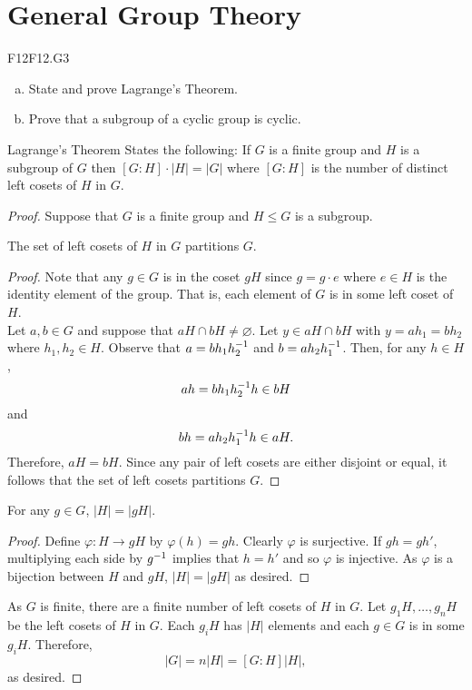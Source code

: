 \documentclass[../AlgebraQualSolutions.tex]{subfiles}
\begin{document}
\section{General Group Theory}

\begin{prob}{F12}{F12.G3}
	\begin{enumerate}[(a)]
	\item State and prove Lagrange's Theorem.
	\item Prove that a subgroup of a cyclic group is cyclic.
	\end{enumerate}
	\end{prob}
	
	Lagrange's Theorem States the following: If $G$ is a finite group and $H$ is a subgroup of $G$ then $[G:H]\cdot|H| = |G|$ where $[G:H]$ is the number of distinct left cosets of $H$ in $G$.

	\begin{proof}
		Suppose that $G$ is a finite group and $H \leq G$ is a subgroup.

		\begin{claim}
			The set of left cosets of $H$ in $G$ partitions $G$.

			\begin{proof}
				Note that any $g \in G$ is in the coset $gH$ since $g = g\cdot e$ where $e \in H$ is the identity element of the group. That is, each element of $G$ is in some left coset of $H$.\\

				Let $a,b \in G$ and suppose that $aH \cap bH \neq \varnothing$. Let $y \in aH \cap bH$ with $y = ah_1 = bh_2$ where $h_1,h_2 \in H$. Observe that $a = bh_1h_2^{-1}$ and $b = ah_2h_1^{-1}$. Then, for any $h \in H$,
					\[ah = bh_1h_2^{-1} h \in bH \]
				and
					\[bh = ah_2h_1^{-1} h \in aH.\]
				Therefore, $aH = bH$. Since any pair of left cosets are either disjoint or equal, it follows that the set of left cosets partitions $G$.
			\end{proof}
		\end{claim}

		\begin{claim}
			For any $g \in G$, $|H| = |gH|$.

			\begin{proof}
				Define $\varphi: H \to gH$ by $\varphi(h) = gh$. Clearly $\varphi$ is surjective. If $gh = gh'$, multiplying each side by $g^{-1}$ implies that $h = h'$ and so $\varphi$ is injective. As $\varphi$ is a bijection between $H$ and $gH$, $|H| = |gH|$ as desired. 
			\end{proof}
		\end{claim}

		As $G$ is finite, there are a finite number of left cosets of $H$ in $G$. Let $g_1H, \ldots, g_nH$ be the left cosets of $H$ in $G$. Each $g_iH$ has $|H|$ elements and each $g \in G$ is in some $g_iH$. Therefore,
			\[|G| = n|H| = [G:H]|H|,\]
		as desired.
	\end{proof}
\end{document}
